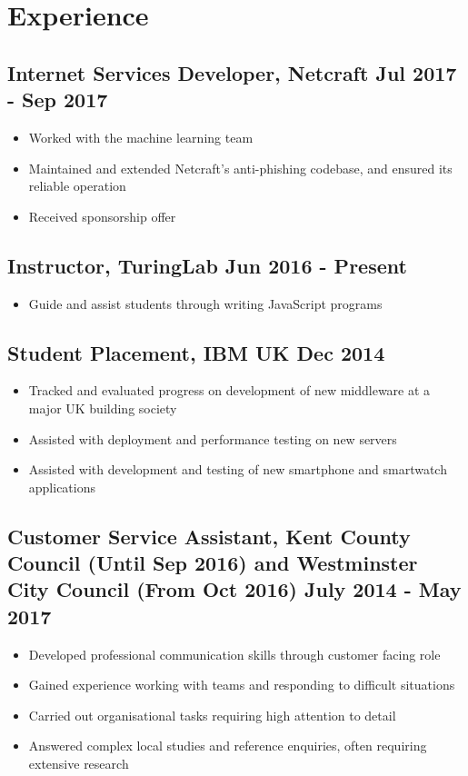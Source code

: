 \documentclass[a4paper, 8pt]{extarticle}
\begin{document}
\begin{minipage}[t]{.66\textwidth}
\section*{Experience}

\subsection*{Internet Services Developer, Netcraft \hfill Jul 2017 - Sep 2017}
\begin{itemize}
	\item Worked with the machine learning team
	\item Maintained and extended Netcraft's anti-phishing codebase, and ensured its reliable operation
	\item Received sponsorship offer
\end{itemize}

\subsection*{Instructor, TuringLab \hfill Jun 2016 - Present}
\begin{itemize}
	\item Guide and assist students through writing JavaScript programs
\end{itemize}

\subsection*{Student Placement, IBM UK \hfill Dec 2014}
\begin{itemize}
	\item Tracked and evaluated progress on development of new middleware at a major UK building society
	\item Assisted with deployment and performance testing on new servers
	\item Assisted with development and testing of new smartphone and smartwatch applications
\end{itemize}

\subsection*{Customer Service Assistant, Kent County Council (Until Sep 2016) and Westminster City Council (From Oct 2016) \hfill July 2014 - May 2017}
\begin{itemize}
	\item Developed professional communication skills through customer facing role
	\item Gained experience working with teams and responding to difficult situations
	\item Carried out organisational tasks requiring high attention to detail
	\item Answered complex local studies and reference enquiries, often requiring extensive research
\end{itemize}



\end{minipage}
\end{document}
